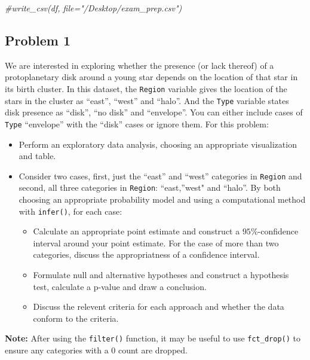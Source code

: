 \documentclass[]{article}
\newenvironment{Shaded}{\begin{snugshade}}{\end{snugshade}}
\newcommand{\CommentTok}[1]{\textcolor[rgb]{0.56,0.35,0.01}{\textit{#1}}}
\providecommand{\tightlist}{%
  \setlength{\itemsep}{0pt}\setlength{\parskip}{0pt}}
\begin{document}
\begin{Shaded}
\begin{Highlighting}[]
\CommentTok{#write_csv(df, file="/Desktop/exam_prep.csv")}
\end{Highlighting}
\end{Shaded}

\hypertarget{problem-1}{%
\subsection{Problem 1}\label{problem-1}}

We are interested in exploring whether the presence (or lack thereof) of
a protoplanetary disk around a young star depends on the location of
that star in its birth cluster. In this dataset, the \texttt{Region}
variable gives the location of the stars in the cluster as ``east'',
``west'' and ``halo''. And the \texttt{Type} variable states disk
presence as ``disk'', ``no disk'' and ``envelope''. You can either
include cases of \texttt{Type} ``envelope'' with the ``disk'' cases or
ignore them. For this problem:

\begin{itemize}
\tightlist
\item
  Perform an exploratory data analysis, choosing an appropriate
  visualization and table.
\item
  Consider two cases, first, just the ``east'' and ``west'' categories
  in \texttt{Region} and second, all three categories in
  \texttt{Region}: ``east,''west" and ``halo''. By both choosing an
  appropriate probability model and using a computational method with
  \texttt{infer()}, for each case:

  \begin{itemize}
  \tightlist
  \item
    Calculate an appropriate point estimate and construct a
    \(95\%\)-confidence interval around your point estimate. For the
    case of more than two categories, discuss the appropriatness of a
    confidence interval.
  \item
    Formulate null and alternative hypotheses and construct a hypothesis
    test, calculate a p-value and draw a conclusion.
  \item
    Discuss the relevent criteria for each approach and whether the data
    conform to the criteria.
  \end{itemize}
\end{itemize}

\textbf{Note:} After using the \texttt{filter()} function, it may be
useful to use \texttt{fct\_drop()} to ensure any categories with a 0
count are dropped.
\end{document}
